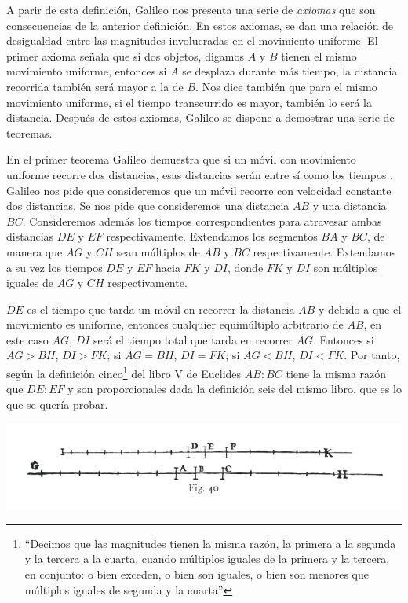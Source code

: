 A parir de esta definición, Galileo nos presenta una serie de \textit{axiomas} que son consecuencias de la anterior definición. En estos axiomas, se dan una relación de desigualdad entre las magnitudes involucradas en el movimiento uniforme. El primer axioma señala que si dos objetos, digamos $A$ y $B$ tienen el mismo movimiento uniforme, entonces si $A$ se desplaza durante más tiempo, la distancia recorrida también será mayor a la de $B$. Nos dice también que para el mismo movimiento uniforme, si el tiempo transcurrido es mayor, también lo será la distancia. Después de estos axiomas, Galileo se dispone a demostrar una serie de teoremas.

En el primer teorema Galileo demuestra que si un móvil con movimiento uniforme recorre dos distancias, esas distancias serán entre sí como los tiempos \cite[p. 215]{galtre}. Galileo nos pide que consideremos que un móvil recorre con velocidad constante dos distancias. Se nos pide que consideremos una distancia $AB$ y una distancia $BC$. Consideremos además los tiempos correspondientes para atravesar ambas distancias $DE$ y $EF$ respectivamente. Extendamos los segmentos $BA$ y $BC$, de manera que $AG$ y $CH$ sean múltiplos de $AB$ y $BC$ respectivamente. Extendamos a su vez los tiempos $DE$ y $EF$ hacia $FK$ y $DI$, donde $FK$ y $DI$ son múltiplos iguales de $AG$ y $CH$ respectivamente.

$DE$ es el tiempo que tarda un móvil en recorrer la distancia $AB$ y debido a que el movimiento es uniforme, entonces cualquier equimúltiplo arbitrario de $AB$, en este caso $AG$, $DI$ será el tiempo total que tarda en recorrer $AG$. Entonces si $AG > BH$, $DI > FK$; si $AG = BH$, $DI = FK$; si $AG < BH$, $DI < FK$. Por tanto, según la definición cinco\footnote{``Decimos que las magnitudes tienen la misma razón, la primera a la segunda y  la tercera a la cuarta, cuando múltiplos iguales de la primera y la tercera, en conjunto: o bien exceden, o bien son iguales, o bien son menores que múltiplos iguales de segunda y la cuarta''} del libro V de Euclides \cite{Euclides1956} $AB:BC$ tiene la misma razón que $DE:EF$ y son proporcionales dada la definición seis del mismo libro, que es lo que se quería probar.

\includegraphics[width=\textwidth]{fig40.jpg}


